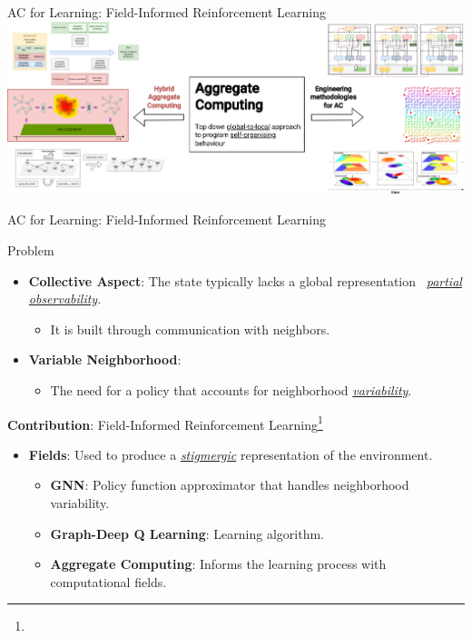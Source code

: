 \documentclass[presentation, 9pt,169]{beamer}\mode<presentation>{\usetheme{AMSBolognaFC}}
\begin{document}
\begin{frame}{AC for Learning: Field-Informed Reinforcement Learning}
\includegraphics[width=\textwidth]{img/contribution-focus.drawio.png}
\end{frame}
\begin{frame}{AC for Learning: Field-Informed Reinforcement Learning}

  \begin{block}{Problem}
    \begin{itemize}
      \item \textbf{Collective Aspect}: The state typically lacks a global representation \faArrowRight \, \emph{\underline{partial observability}}.
        \begin{itemize}
          \item It is built through communication with neighbors.
        \end{itemize}
      \item \textbf{Variable Neighborhood}: 
        \begin{itemize}
          \item The need for a policy that accounts for neighborhood \emph{\underline{variability}}.
        \end{itemize}
    \end{itemize}
  \end{block}

  \begin{alertblock}{\textbf{Contribution}: Field-Informed Reinforcement Learning\footnote[frame]{}} 
    \begin{itemize}
      \item \textbf{Fields}: Used to produce a \emph{\underline{stigmergic}} representation of the environment.
      \begin{itemize}
        \item \textbf{GNN}: Policy function approximator that handles neighborhood variability.
        \item \textbf{Graph-Deep Q Learning}: Learning algorithm.
        \item \textbf{Aggregate Computing}: Informs the learning process with computational fields.
      \end{itemize}
    \end{itemize}
  \end{alertblock}

\end{frame}
\end{document}
